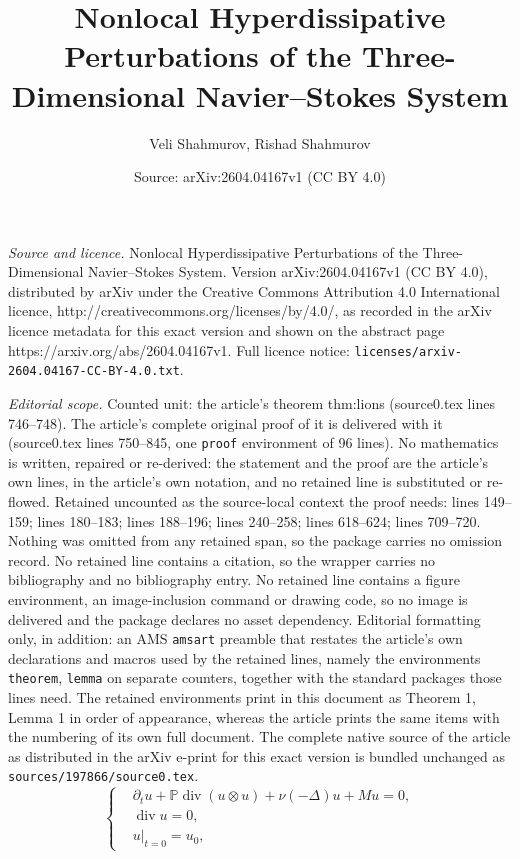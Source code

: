 \documentclass[10pt,a4paper]{amsart}
\title{Nonlocal Hyperdissipative Perturbations of the Three-Dimensional Navier--Stokes System}
\author{Veli Shahmurov, Rishad Shahmurov}
\date{Source: arXiv:2604.04167v1 (CC BY 4.0)}
\newcommand{\Pcal}{\mathbb{P}}
\newcommand{\diver}{\operatorname{div}}
\begin{document}
\maketitle

\noindent\emph{Source and licence.} Nonlocal Hyperdissipative Perturbations of the Three-Dimensional Navier--Stokes System. Version arXiv:2604.04167v1 (CC BY 4.0), distributed by arXiv under the Creative Commons Attribution 4.0 International licence, http://creativecommons.org/licenses/by/4.0/, as recorded in the arXiv licence metadata for this exact version and shown on the abstract page https://arxiv.org/abs/2604.04167v1. Full licence notice: \texttt{licenses/arxiv-2604.04167-CC-BY-4.0.txt}.\par\smallskip

\noindent\textit{Editorial scope.} Counted unit: the article's theorem thm:lions (source0.tex lines 746--748). The article's complete original proof of it is delivered with it (source0.tex lines 750--845, one \texttt{proof} environment of 96 lines). No mathematics is written, repaired or re-derived: the statement and the proof are the article's own lines, in the article's own notation, and no retained line is substituted or re-flowed.  Retained uncounted as the source-local context the proof needs: lines 149--159; lines 180--183; lines 188--196; lines 240--258; lines 618--624; lines 709--720.  Nothing was omitted from any retained span, so the package carries no omission record.  No retained line contains a citation, so the wrapper carries no bibliography and no bibliography entry.  No retained line contains a figure environment, an image-inclusion command or drawing code, so no image is delivered and the package declares no asset dependency.  Editorial formatting only, in addition: an AMS \texttt{amsart} preamble that restates the article's own declarations and macros used by the retained lines, namely the environments \texttt{theorem}, \texttt{lemma} on separate counters, together with the standard packages those lines need.  The retained environments print in this document as Theorem 1, Lemma 1 in order of appearance, whereas the article prints the same items with the numbering of its own full document.  The complete native source of the article as distributed in the arXiv e-print for this exact version is bundled unchanged as \texttt{sources/197866/source0.tex}.
\begin{equation}\label{eq:main}
\left\{
\begin{aligned}
&\partial_t u + \Pcal \diver (u\otimes u) + \nu(-\Delta)u + M u = 0,
\\
&\diver u = 0,
\\
&u|_{t=0}=u_0,
\end{aligned}
\right.
\end{equation}
\end{document}

